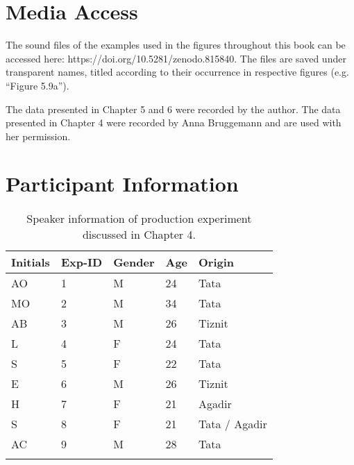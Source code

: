 \setcounter{chapter}{1}
\section{Media Access}
The sound files of the examples used in the figures throughout this book can be accessed here: https://doi.org/10.5281/zenodo.815840. The files are saved under transparent names, titled according to their occurrence in respective figures (e.g. “Figure 5.9a”).

The data presented in Chapter 5 and 6 were recorded by the author. The data presented in Chapter 4 were recorded by Anna Bruggemann and are used with her permission.

\section{Participant Information}
\begin{table}
\caption{Speaker information of production experiment discussed in Chapter 4.}
\label{Table A1}
\begin{tabular}{lllll}
\lsptoprule
\textbf{Initials}                        & \textbf{Exp-ID} & \textbf{Gender} & \textbf{Age} & \textbf{Origin}        \\
\midrule
AO                              & 1      & M      & 24  & Tata          \\
MO                              & 2      & M      & 34  & Tata          \\
AB                              & 3      & M      & 26  & Tiznit        \\
L                               & 4      & F      & 24  & Tata          \\
S                               & 5      & F      & 22  & Tata          \\
E                               & 6      & M      & 26  & Tiznit        \\
H                               & 7      & F      & 21  & Agadir        \\
S                               & 8      & F      & 21  & Tata / Agadir \\
AC                              & 9      & M      & 28  & Tata         \\
\lspbottomrule
\end{tabular}
\end{table}

